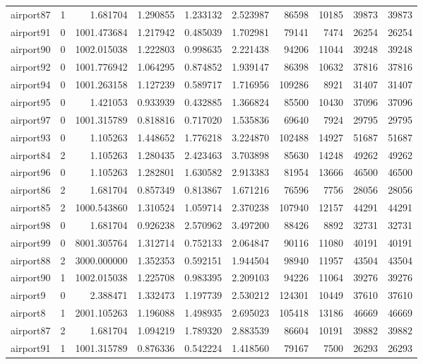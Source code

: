 \begin{longtable}{|l|r|r|r|r|r|r|r|r|r|}
airport87 & 1 & 1.681704 & 1.290855 & 1.233132 & 2.523987 & 86598 & 10185 & 39873 & 39873 \\
airport91 & 0 & 1001.473684 & 1.217942 & 0.485039 & 1.702981 & 79141 & 7474 & 26254 & 26254 \\
airport90 & 0 & 1002.015038 & 1.222803 & 0.998635 & 2.221438 & 94206 & 11044 & 39248 & 39248 \\
airport92 & 0 & 1001.776942 & 1.064295 & 0.874852 & 1.939147 & 86398 & 10632 & 37816 & 37816 \\
airport94 & 0 & 1001.263158 & 1.127239 & 0.589717 & 1.716956 & 109286 & 8921 & 31407 & 31407 \\
airport95 & 0 & 1.421053 & 0.933939 & 0.432885 & 1.366824 & 85500 & 10430 & 37096 & 37096 \\
airport97 & 0 & 1001.315789 & 0.818816 & 0.717020 & 1.535836 & 69640 & 7924 & 29795 & 29795 \\
airport93 & 0 & 1.105263 & 1.448652 & 1.776218 & 3.224870 & 102488 & 14927 & 51687 & 51687 \\
airport84 & 2 & 1.105263 & 1.280435 & 2.423463 & 3.703898 & 85630 & 14248 & 49262 & 49262 \\
airport96 & 0 & 1.105263 & 1.282801 & 1.630582 & 2.913383 & 81954 & 13666 & 46500 & 46500 \\
airport86 & 2 & 1.681704 & 0.857349 & 0.813867 & 1.671216 & 76596 & 7756 & 28056 & 28056 \\
airport85 & 2 & 1000.543860 & 1.310524 & 1.059714 & 2.370238 & 107940 & 12157 & 44291 & 44291 \\
airport98 & 0 & 1.681704 & 0.926238 & 2.570962 & 3.497200 & 88426 & 8892 & 32731 & 32731 \\
airport99 & 0 & 8001.305764 & 1.312714 & 0.752133 & 2.064847 & 90116 & 11080 & 40191 & 40191 \\
airport88 & 2 & 3000.000000 & 1.352353 & 0.592151 & 1.944504 & 98940 & 11957 & 43504 & 43504 \\
airport90 & 1 & 1002.015038 & 1.225708 & 0.983395 & 2.209103 & 94226 & 11064 & 39276 & 39276 \\
airport9 & 0 & 2.388471 & 1.332473 & 1.197739 & 2.530212 & 124301 & 10449 & 37610 & 37610 \\
airport8 & 1 & 2001.105263 & 1.196088 & 1.498935 & 2.695023 & 105418 & 13186 & 46669 & 46669 \\
airport87 & 2 & 1.681704 & 1.094219 & 1.789320 & 2.883539 & 86604 & 10191 & 39882 & 39882 \\
airport91 & 1 & 1001.315789 & 0.876336 & 0.542224 & 1.418560 & 79167 & 7500 & 26293 & 26293 \\

\end{longtable}
